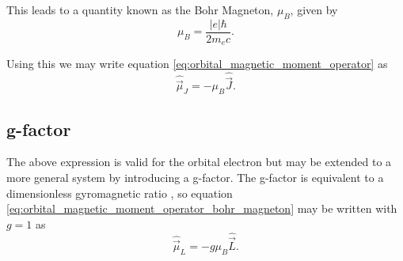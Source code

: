 This leads to a quantity known as the Bohr Magneton, $\mu_B$, given by 
\begin{equation}
    \mu_B = \frac{|e|\hbar}{2m_e c}.
    \label{eq:bohr_magneton}
\end{equation}

Using this we may write equation \ref{eq:orbital_magnetic_moment_operator} as 
\begin{equation}
    \hat{\vec{\mu}}_J = -\mu_B\hat{\vec{J}}. 
    \label{eq:orbital_magnetic_moment_operator_bohr_magneton}
\end{equation}





\subsection{g-factor}
The above expression is valid for the orbital electron but may be extended to a more general system by introducing a g-factor. The g-factor is equivalent to a dimensionless gyromagnetic ratio \cite{giancoli2008physics}, so equation \ref{eq:orbital_magnetic_moment_operator_bohr_magneton} may be written with $g=1$ as 
\begin{equation}
    \hat{\vec{\mu}}_L = -g\mu_B\hat{\vec{L}}. 
    \label{eq:orbital_magnetic_moment_operator_bohr_magneton_g_factor}
\end{equation}


